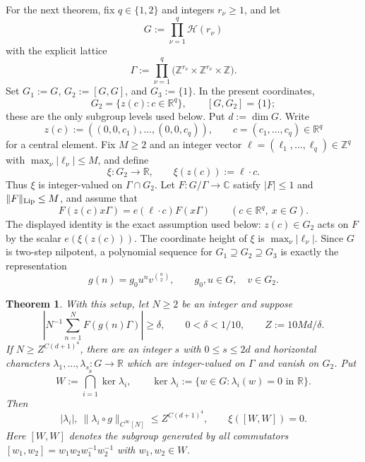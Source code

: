 \documentclass[twoside]{aomart}
\theoremstyle{paperplain}
\newtheorem{theorem}{Theorem}[section]
\theoremstyle{paperdefinition}
\numberwithin{equation}{section}
\begin{document}
For the next theorem, fix $q\in\{1,2\}$ and integers $r_\nu\ge1$, and let
\[
 G:=\prod_{\nu=1}^{q}\mathcal H(r_\nu)
\]
with the explicit lattice
\[
 \Gamma:=\prod_{\nu=1}^{q}
 \bigl(\mathbb Z^{r_\nu}\times\mathbb Z^{r_\nu}\times\mathbb Z\bigr).
\]
Set $G_1:=G$, $G_2:=[G,G]$, and $G_3:=\{1\}$. In the present
coordinates,
\[
 G_2=\{z(c):c\in\mathbb R^q\},
 \qquad [G,G_2]=\{1\};
\]
these are the only subgroup levels used below. Put $d:=\dim G$. Write
\begin{equation*}
 z(c):=((0,0,c_1),\ldots,(0,0,c_q)),\qquad
 c=(c_1,\ldots,c_q)\in\mathbb R^q
\end{equation*}
for a central element. Fix $M\ge2$ and an integer vector
$\ell=(\ell_1,\ldots,\ell_q)\in\mathbb Z^q$ with
$\max_\nu|\ell_\nu|\le M$, and define
\begin{equation*}
 \xi:G_2\longrightarrow\mathbb R,\qquad
 \xi(z(c)):=\ell\cdot c.
\end{equation*}
Thus $\xi$ is integer-valued on $\Gamma\cap G_2$. Let
$F:G/\Gamma\to\mathbb C$ satisfy $|F|\le1$ and
$\|F\|_{\rm Lip}\le M$, and assume that
\begin{equation}
 F(z(c)x\Gamma)=e(\ell\cdot c)F(x\Gamma)
 \qquad(c\in\mathbb R^q,\ x\in G).
\label{inv:eq:vertical-frequency-assumption}
\end{equation}
The displayed identity is the exact assumption used below: $z(c)\in G_2$
acts on $F$ by the scalar $e(\xi(z(c)))$.  The coordinate height of
$\xi$ is $\max_\nu|\ell_\nu|$.  Since $G$ is two-step nilpotent, a
polynomial sequence for $G_1\supseteq G_2\supseteq G_3$ is exactly
the representation
\[
 g(n)=g_0u^nv^{\binom n2},
 \qquad g_0,u\in G,\quad v\in G_2.
\]

\begin{theorem}
\label{inv:vertical-kernel}
With this setup, let $N\ge2$ be an integer and suppose
\begin{equation*}
 \left|N^{-1}\sum_{n=1}^N F(g(n)\Gamma)\right|\ge\delta,
 \qquad 0<\delta<1/10,\qquad Z:=10Md/\delta.
\end{equation*}
If $N\ge Z^{C(d+1)^4}$, there are an integer $s$ with
$0\le s\le2d$ and horizontal characters
$\lambda_1,\ldots,\lambda_s:G\to\mathbb R$ which are integer-valued
on $\Gamma$ and vanish on $G_2$. Put
\[
 W:=\bigcap_{i=1}^{s}\ker\lambda_i,
 \qquad \ker\lambda_i:=\{w\in G:\lambda_i(w)=0\text{ in }\mathbb R\}.
\]
Then
\begin{equation*}
 |\lambda_i|,\ \|\lambda_i\circ g\|_{C^\infty[N]}
 \le Z^{C(d+1)^4},
 \qquad
 \xi([W,W])=0.
\end{equation*}
Here $[W,W]$ denotes the subgroup generated by all commutators
$[w_1,w_2]=w_1w_2w_1^{-1}w_2^{-1}$ with $w_1,w_2\in W$.

\end{theorem}
\end{document}
